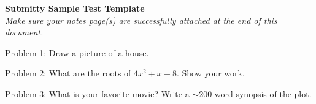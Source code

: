 \documentclass[10pt]{article}
\begin{document}
\begin{center}
  {\LARGE \textbf {Submitty Sample Test Template}}
  \vspace{0.1in}
  \\ 
  {\em Make sure your notes page(s) are successfully attached at the end of this document.}
\end{center}

Problem 1: Draw a picture of a house.

\fbox{\parbox{6.9in}{ \ \vspace{4.1in} \ }}

\vspace{0.2in}



Problem 2: What are the roots of $ 4x^2 + x -8 $.  Show your work.

\fbox{\parbox{6.9in}{ \ \vspace{4.1in} \ }}

\newpage

Problem 3: What is your favorite movie?  Write a $\sim$200 word
synopsis of the plot.

\fbox{\parbox{6.9in}{ \ \vspace{9.5in} \ }}

\newpage




\end{document}
